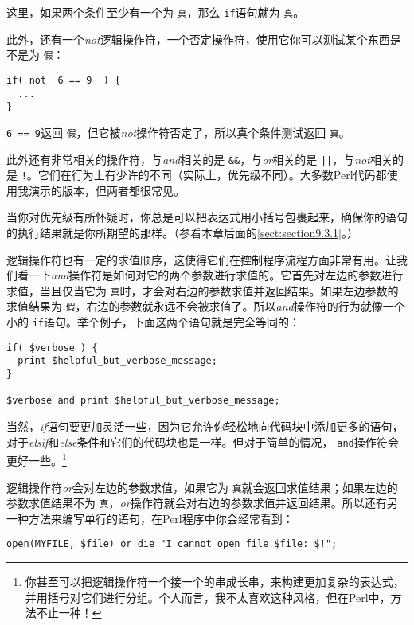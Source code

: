 这里，如果两个条件至少有一个为 \verb|真|，那么 \verb|if|语句就为 \verb|真|。

此外，还有一个\textit{not}逻辑操作符，一个否定操作符，使用它你可以测试某个东西是不是为 \verb|假|：

\begin{lstlisting}
if( not  6 == 9  ) {
  ...
}
\end{lstlisting}

 \verb|6 == 9|返回 \verb|假|，但它被\textit{not}操作符否定了，所以真个条件测试返回 \verb|真|。

此外还有非常相关的操作符，与\textit{and}相关的是 \verb=&&=，与\textit{or}相关的是 \verb=||=，与\textit{not}相关的是 \verb=!=。它们在行为上有少许的不同（实际上，优先级不同）。大多数Perl代码都使用我演示的版本，但两者都很常见。

当你对优先级有所怀疑时，你总是可以把表达式用小括号包裹起来，确保你的语句的执行结果就是你所期望的那样。（参看本章后面的\autoref{sect:section9.3.1}。）

逻辑操作符也有一定的求值顺序，这使得它们在控制程序流程方面非常有用。让我们看一下\textit{and}操作符是如何对它的两个参数进行求值的。它首先对左边的参数进行求值，当且仅当它为 \verb|真|时，才会对右边的参数求值并返回结果。如果左边参数的求值结果为 \verb|假|，右边的参数就永远不会被求值了。所以\textit{and}操作符的行为就像一个小的 \verb|if|语句。举个例子，下面这两个语句就是完全等同的：

\begin{lstlisting}
if( $verbose ) {
  print $helpful_but_verbose_message;
}

$verbose and print $helpful_but_verbose_message;
\end{lstlisting}

当然，\textit{if}语句要更加灵活一些，因为它允许你轻松地向代码块中添加更多的语句，对于\textit{elsif}和\textit{else}条件和它们的代码块也是一样。但对于简单的情况， \verb|and|操作符会更好一些。\footnote{你甚至可以把逻辑操作符一个接一个的串成长串，来构建更加复杂的表达式，并用括号对它们进行分组。个人而言，我不太喜欢这种风格，但在Perl中，方法不止一种！}

逻辑操作符\textit{or}会对左边的参数求值，如果它为 \verb|真|就会返回求值结果；如果左边的参数求值结果不为 \verb|真|，\textit{or}操作符就会对右边的参数求值并返回结果。所以还有另一种方法来编写单行的语句，在Perl程序中你会经常看到：

\begin{lstlisting}
open(MYFILE, $file) or die "I cannot open file $file: $!";
\end{lstlisting}

